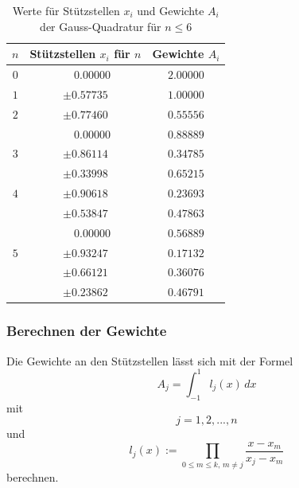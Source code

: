 \begin{table}
    \centering
    \begin{tabular}{|c|c|c|}
        \hline
        $n$ & Stützstellen $x_{i}$ für $n$ & Gewichte $A_{i}$\\
        \hline
        $0$ & $ \phantom{-} 0.00000 $ & $ 2.00000 $ \\
        \hline
        $1$ & $ \pm 0.57735 $ & $ 1.00000 $ \\
        \hline
        $2$ & $ \pm 0.77460 $ & $ 0.55556 $ \\
            & $ \phantom{-} 0.00000 $ & $ 0.88889 $ \\
        \hline
        $3$ & $ \pm 0.86114 $ & $ 0.34785 $ \\
            & $ \pm 0.33998 $ & $ 0.65215 $ \\
        \hline
        $4$ & $ \pm 0.90618 $ & $ 0.23693 $ \\
            & $ \pm 0.53847 $ & $ 0.47863 $ \\
            & $ \phantom{-} 0.00000 $ & $ 0.56889 $ \\
        \hline
        $5$ & $ \pm 0.93247 $ & $ 0.17132 $ \\
            & $ \pm 0.66121 $ & $ 0.36076 $ \\
            & $ \pm 0.23862 $ & $ 0.46791 $ \\
        \hline
    \end{tabular}
    \caption{Werte für Stützstellen $x_{i}$ und Gewichte $A_{i}$ der Gauss-Quadratur für $n \leq 6$
    \label{buch:table:gaussgewichtwerte}}    
\end{table}

\subsubsection{Berechnen der Gewichte}
Die Gewichte an den Stützstellen lässt sich mit der Formel
\begin{equation*}
    A_{j} = \int_{-1}^{1} l_j(x) \, dx
\end{equation*}
mit
\begin{equation*}
    j = 1, 2, ... , n
\end{equation*}
und 
\begin{equation}
    l_{j}(x) := \prod_{0 \leq m \leq k, \, m \neq j} \frac{x - x_{m}}{x_{j} - x_{m}}
\end{equation}
berechnen.

